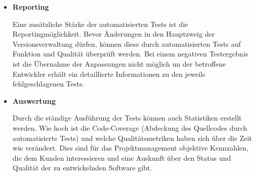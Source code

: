 \begin{itemize}
	\item \textbf{Reporting}
	
	Eine zusätzliche Stärke der automatisierten Tests ist die Reportingmöglichkeit. Bevor Änderungen in den Hauptzweig der Versionsverwaltung dürfen, können diese durch automatisierten Tests auf Funktion und Qualität überprüft werden. Bei einem negativen Testergebnis ist die Übernahme der Anpassungen nicht möglich un der betroffene Entwickler erhält ein detaillierte Informationen zu den jeweils fehlgeschlagenen Tests.
	
	\item \textbf{Auswertung}
	
	Durch die ständige Ausführung der Tests können auch Statistiken erstellt werden. Wie hoch ist die Code-Coverage (Abdeckung des Quellcodes durch automatisierte Tests) und welche Qualitätsmetriken haben sich über die Zeit wie verändert. Dies sind für das Projektmanagement objektive Kennzahlen, die dem Kunden interessieren und eine Auskunft über den Status und Qualität der zu entwickelnden Software gibt.

\end{itemize}

